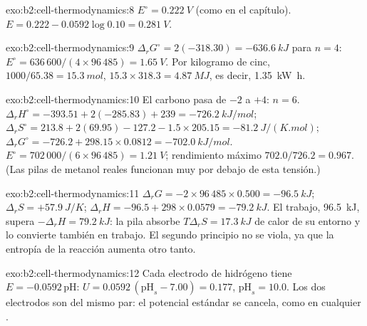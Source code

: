 \begin{solution}{exo:b2:cell-thermodynamics:8}
$E^\circ = \qty{0.222}{V}$ (como en el capítulo). $E = 0.222 - 0.0592\log 0.10 =
\qty{0.281}{V}$.
\end{solution}

\begin{solution}{exo:b2:cell-thermodynamics:9}
$\Delta_r G^\circ = 2(-318.30) = \qty{-636.6}{kJ}$ para $n = 4$: $E^\circ =
636\,600/(4 \times 96\,485) = \qty{1.65}{V}$. Por kilogramo de cinc, $1000/65.38 =
\qty{15.3}{mol}$, $15.3 \times 318.3 = \qty{4.87}{MJ}$, es decir, \qty{1.35}{kW.h}.
\end{solution}

\begin{solution}{exo:b2:cell-thermodynamics:10}
El carbono pasa de $-2$ a $+4$: $n = 6$. $\Delta_r H^\circ = -393.51 + 2(-285.83) +
239 = \qty{-726.2}{kJ/mol}$; $\Delta_r S^\circ = 213.8 + 2(69.95) - 127.2 - 1.5
\times 205.15 = \qty{-81.2}{J/(K.mol)}$; $\Delta_r G^\circ = -726.2 + 298.15 \times
0.0812 = \qty{-702.0}{kJ/mol}$. $E^\circ = 702\,000/(6 \times 96\,485) =
\qty{1.21}{V}$; rendimiento máximo $702.0/726.2 = 0.967$. (Las pilas de metanol reales
funcionan muy por debajo de esta tensión.)
\end{solution}

\begin{solution}{exo:b2:cell-thermodynamics:11}
$\Delta_r G = -2 \times 96\,485 \times 0.500 = \qty{-96.5}{kJ}$; $\Delta_r S = +\qty{57.9}{J/K}$;
$\Delta_r H = -96.5 + 298 \times 0.0579 = \qty{-79.2}{kJ}$. El trabajo, \qty{96.5}{kJ},
supera $-\Delta_r H = \qty{79.2}{kJ}$: la pila absorbe $T\Delta_r S = \qty{17.3}{kJ}$
de calor de su entorno y lo convierte también en trabajo. El segundo principio
no se viola, ya que la entropía de la reacción aumenta otro tanto.
\end{solution}

\begin{solution}{exo:b2:cell-thermodynamics:12}
Cada electrodo de hidrógeno tiene $E = -0.0592\,\mathrm{pH}$: $U = 0.0592\,(\mathrm{pH}_s -
7.00) = 0.177$, $\mathrm{pH}_s = 10.0$. Los dos electrodos son del mismo par:
el potencial estándar se cancela, como en cualquier .
\end{solution}

